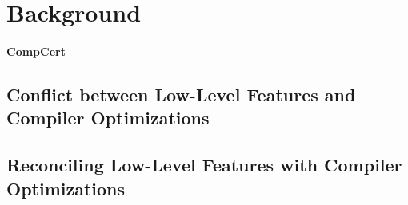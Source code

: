 \section{Background}
\label{sec:background}

\paragraph{CompCert}

\subsection{Conflict between Low-Level Features and Compiler Optimizations}
\label{sec:introduction:problem}
\subsection{Reconciling Low-Level Features with Compiler Optimizations}
